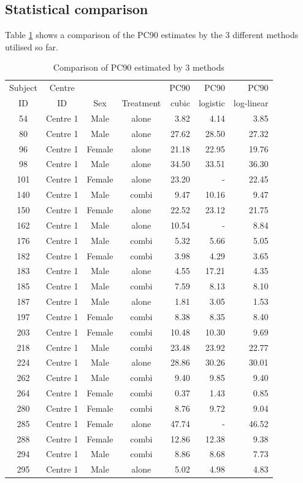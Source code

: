 \subsection{Statistical comparison}
Table \ref{PC90} shows a comparison of the PC90 estimates by the 3 different methods utilised so far.
\begin{table}
\centering
\caption{Comparison of PC90 estimated by 3 methods}\label{PC90}
\begin{tabular}{|cccc|rrr|}
\hline
Subject&Centre&&&PC90&PC90&PC90\\
ID&ID&Sex&Treatment&cubic&logistic&log-linear\\
\hline
54&Centre 1&Male&alone&3.82&4.14&3.85\\
80&Centre 1&Male&alone&27.62&28.50&27.32\\
96&Centre 1&Female&alone&21.18&22.95&19.76\\
98&Centre 1&Male&alone&34.50&33.51&36.30\\
101&Centre 1&Female&alone&23.20&-&22.45\\
140&Centre 1&Male&combi&9.47&10.16&9.47\\
150&Centre 1&Female&alone&22.52&23.12&21.75\\
162&Centre 1&Male&alone&10.54&-&8.84\\
176&Centre 1&Male&combi&5.32&5.66&5.05\\
182&Centre 1&Female&combi&3.98&4.29&3.65\\
183&Centre 1&Male&alone&4.55&17.21&4.35\\
185&Centre 1&Male&combi&7.59&8.13&8.10\\
187&Centre 1&Male&alone&1.81&3.05&1.53\\
197&Centre 1&Female&combi&8.38&8.35&8.40\\
203&Centre 1&Female&combi&10.48&10.30&9.69\\
218&Centre 1&Male&combi&23.48&23.92&22.77\\
224&Centre 1&Male&alone&28.86&30.26&30.01\\
262&Centre 1&Male&combi&9.40&9.85&9.40\\
264&Centre 1&Female&combi&0.37&1.43&0.85\\
280&Centre 1&Female&combi&8.76&9.72&9.04\\
285&Centre 1&Female&alone&47.74&-&46.52\\
288&Centre 1&Female&combi&12.86&12.38&9.38\\
294&Centre 1&Male&combi&8.86&8.68&7.73\\
295&Centre 1&Male&alone&5.02&4.98&4.83\\

\end{tabular}
\end{table}
